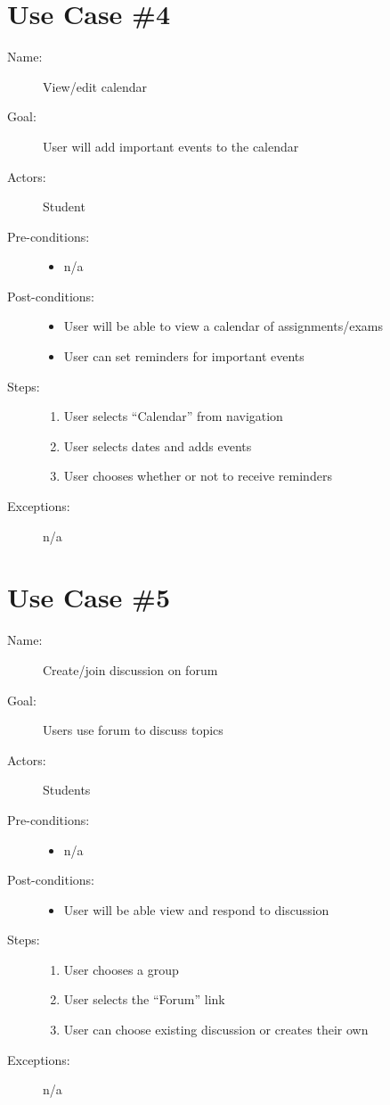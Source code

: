 \section{Use Case \#4}
	\begin{description}
		\item[Name:] View/edit calendar
		\item[Goal:] User will add important events to the calendar
		\item[Actors:] Student
		\item[Pre-conditions:]
		\begin{itemize}
			\item n/a
		\end{itemize}
		\item[Post-conditions:]
		\begin{itemize}
			\item User will be able to view a calendar of assignments/exams
			\item User can set reminders for important events
		\end{itemize}
		\item[Steps:]
		\begin{enumerate}
			\item User selects “Calendar” from navigation
			\item User selects dates and adds events
			\item User chooses whether or not to receive reminders
		\end{enumerate}
		\item[Exceptions:] n/a		
	\end{description}

\section{Use Case \#5}
	\begin{description}
		\item[Name:] Create/join discussion on forum
		\item[Goal:] Users use forum to discuss topics
		\item[Actors:] Students
		\item[Pre-conditions:]
		\begin{itemize}
			\item n/a
		\end{itemize}
		\item[Post-conditions:]
		\begin{itemize}
			\item User will be able view and respond to discussion
		\end{itemize}
		\item[Steps:]
		\begin{enumerate}
			\item User chooses a group
			\item User selects the “Forum” link
			\item User can choose existing discussion or creates their own
		\end{enumerate}
		\item[Exceptions:] n/a		
	\end{description}